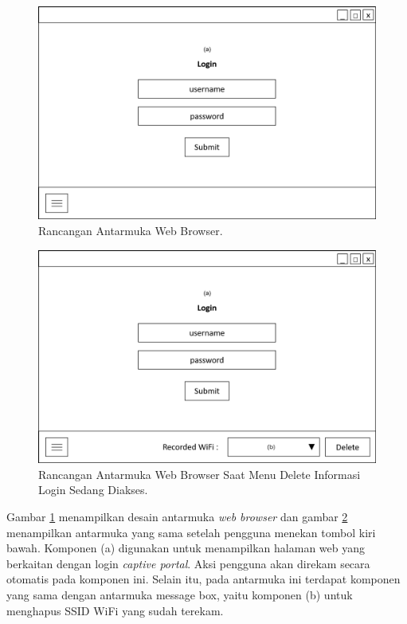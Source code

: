 \begin{figure}[!htb]
    \centering
    \includegraphics[scale=0.4]{Gambar/UI_WebBrowser_Hidden.png}
    \caption[Rancangan Antarmuka Web Browser.]{Rancangan Antarmuka Web Browser.}
    \label{fig:RancanganAntarmukaWebBrowser}
\end{figure}

\begin{figure}[!htb]
    \centering
    \includegraphics[scale=0.4]{Gambar/UI_WebBrowser.png}
    \caption[Rancangan Antarmuka Web Browser Saat Menu Delete Informasi Login Sedang Diakses.]{Rancangan Antarmuka Web Browser Saat Menu Delete Informasi Login Sedang Diakses.}
    \label{fig:RancanganAntarmukaWebBrowserShown}
\end{figure}

Gambar \ref{fig:RancanganAntarmukaWebBrowser} menampilkan desain antarmuka \textit{web browser} dan gambar \ref{fig:RancanganAntarmukaWebBrowserShown} menampilkan antarmuka yang sama setelah pengguna menekan tombol kiri bawah. Komponen (a) digunakan untuk menampilkan halaman web yang berkaitan dengan login \textit{captive portal}. Aksi pengguna akan direkam secara otomatis pada komponen ini. Selain itu, pada antarmuka ini terdapat komponen yang sama dengan antarmuka message box, yaitu komponen (b) untuk menghapus SSID WiFi yang sudah terekam.